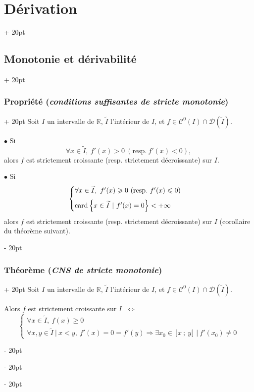 \documentclass[a4paper, 12pt, twoside]{article}
\newcommand{\R}{\mathbb{R}} %
\newcommand{\lr}[1]{\left( #1 \right)}
\newcommand{\set}[1]{\left\{ #1 \right\}}
\newcommand{\ssi}{\ \Leftrightarrow \ }
\renewcommand{\le}{\leqslant}
\renewcommand{\ge}{\geqslant}
\newcommand{\ind}[1][20pt]{\advance\leftskip + #1}
\newcommand{\deind}[1][20pt]{\advance\leftskip - #1}
\newenvironment{indt}[2][20pt]{#2 \par \ind[#1]}{\par \deind} %
\begin{document}
\begin{indt}{\section{Dérivation}}
\begin{indt}{\subsection{Monotonie et dérivabilité}}
            \vspace{12pt}
            
            \begin{indt}{\subsubsection{Propriété (\textit{conditions suffisantes de stricte monotonie})}}
                Soit $I$ un intervalle de $\R$, $\widetilde I$ l'intérieur de $I$, et $f \in \mathcal C^0(I) \cap \mathcal D\!\lr{\widetilde I}$.

                \vspace{6pt}
                
                $\bullet$ Si
                \[
                    \forall x \in \widetilde I,\ f'(x) > 0\ (\text{resp.}\ f'(x) < 0),
                \]
                alors $f$ est strictement croissante (resp. strictement décroissante) sur $I$.

                \vspace{12pt}
                
                $\bullet$ Si
                \[
                    \begin{cases}
                        \forall x \in \widetilde I,\ f'(x) \ge 0\ (\text{resp.}\ f'(x) \le 0)
                        \vspace{6pt}
                        \\
                        \mathrm{card}\set{x \in \widetilde I\ |\ f'(x) = 0} < +\infty
                    \end{cases}
                \]
                alors $f$ est strictement croissante (resp. strictement décroissante) sur $I$
                (corollaire du théorème suivant).
            \end{indt}

            \vspace{12pt}
            
            \begin{indt}{\subsubsection{Théorème (\textit{CNS de stricte monotonie})}}
                Soit $I$ un intervalle de $\R$, $\widetilde I$ l'intérieur de $I$, et $f \in \mathcal C^0(I) \cap \mathcal D\!\lr{\widetilde I}$.

                Alors
                $f$ est strictement croissante sur $I$ $\ssi$
                \[
                    \begin{cases}
                        \forall x \in \widetilde I,\ f(x) \ge 0
                        \\
                        \forall x, y \in \widetilde I\ |\ x < y,\ f'(x) = 0 = f'(y)
                        \Rightarrow \exists x_0 \in\ ]x\ ;\ y[\ \ |\ f'(x_0) \neq 0
                    \end{cases}
                \]


\end{indt}
\end{indt}
\end{indt}
\end{document}

